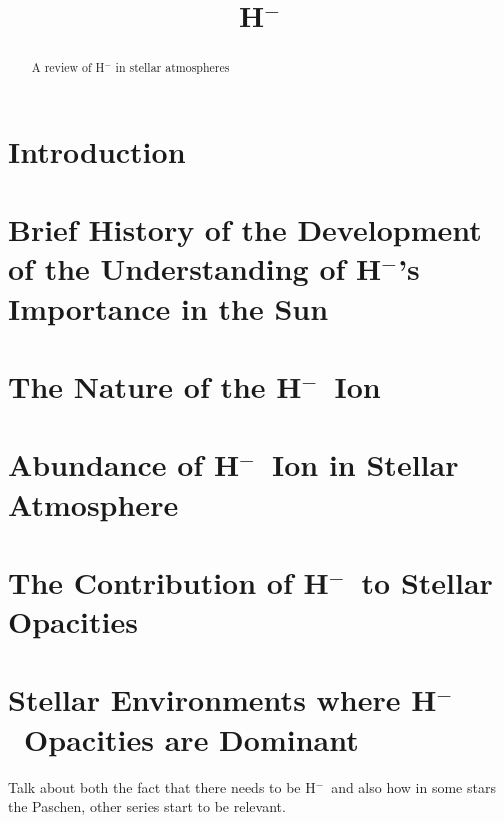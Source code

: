 \documentclass{emulateapj}
\def\h{H$^-$}
\begin{document}
\begin{abstract}
A review of H$^-$ in stellar atmospheres
\end{abstract}

\title{\h}

\section{Introduction}


\section{Brief History of the Development of the Understanding of \h's Importance in the Sun}


\section{The Nature of the \h\ Ion}


\section{Abundance of \h\ Ion in Stellar Atmosphere}


\section{The Contribution of \h\ to Stellar Opacities}


\section{Stellar Environments where \h\ Opacities are Dominant}
Talk about both the fact that there needs to be \h\ and also how in
some stars the Paschen, other series start to be relevant.



\end{document}
